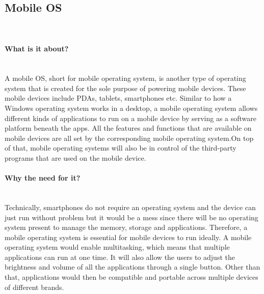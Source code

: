 \documentclass[conference]{IEEEtran}
\begin{document}
\subsection{Mobile OS}\\
\paragraph{What is it about?}\mbox{} \\
A mobile OS, short for mobile operating system, is another type of operating system that is created for the sole purpose of powering mobile devices. These mobile devices include PDAs, tablets, smartphones etc. Similar to how a Windows operating system works in a desktop, a mobile operating system allows different kinds of applications to run on a mobile device by serving as a software platform beneath the apps. All the features and functions that are available on mobile devices are all set by the corresponding mobile operating system.On top of that, mobile operating systems will also be in control of the third-party programs that are used on the mobile device.
\\
\paragraph{Why the need for it?}\mbox{} \\
Technically, smartphones do not require an operating system and the device can just run without problem but it would be a mess since there will be no operating system present to manage the memory, storage and applications. Therefore, a mobile operating system is essential for mobile devices to run ideally. A mobile operating system would enable multitasking, which means that multiple applications can run at one time. It will also allow the users to adjust the brightness and volume of all the applications through a single button. Other than that, applications would then be compatible and portable across multiple devices of different brands.
\\
\end{document}

